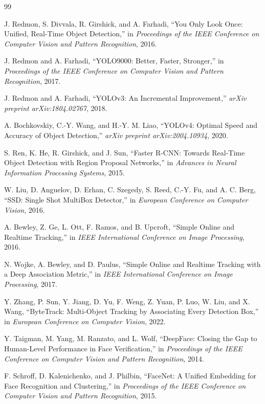 \documentclass[11pt]{article}
\begin{document}
\begin{thebibliography}{99}

J. Redmon, S. Divvala, R. Girshick, and A. Farhadi,
``You Only Look Once: Unified, Real-Time Object Detection,''
in \textit{Proceedings of the IEEE Conference on Computer Vision and Pattern Recognition}, 2016.

J. Redmon and A. Farhadi,
``YOLO9000: Better, Faster, Stronger,''
in \textit{Proceedings of the IEEE Conference on Computer Vision and Pattern Recognition}, 2017.

J. Redmon and A. Farhadi,
``YOLOv3: An Incremental Improvement,''
\textit{arXiv preprint arXiv:1804.02767}, 2018.

A. Bochkovskiy, C.-Y. Wang, and H.-Y. M. Liao,
``YOLOv4: Optimal Speed and Accuracy of Object Detection,''
\textit{arXiv preprint arXiv:2004.10934}, 2020.

S. Ren, K. He, R. Girshick, and J. Sun,
``Faster R-CNN: Towards Real-Time Object Detection with Region Proposal Networks,''
in \textit{Advances in Neural Information Processing Systems}, 2015.

W. Liu, D. Anguelov, D. Erhan, C. Szegedy, S. Reed, C.-Y. Fu, and A. C. Berg,
``SSD: Single Shot MultiBox Detector,''
in \textit{European Conference on Computer Vision}, 2016.

A. Bewley, Z. Ge, L. Ott, F. Ramos, and B. Upcroft,
``Simple Online and Realtime Tracking,''
in \textit{IEEE International Conference on Image Processing}, 2016.

N. Wojke, A. Bewley, and D. Paulus,
``Simple Online and Realtime Tracking with a Deep Association Metric,''
in \textit{IEEE International Conference on Image Processing}, 2017.

Y. Zhang, P. Sun, Y. Jiang, D. Yu, F. Weng, Z. Yuan, P. Luo, W. Liu, and X. Wang,
``ByteTrack: Multi-Object Tracking by Associating Every Detection Box,''
in \textit{European Conference on Computer Vision}, 2022.

Y. Taigman, M. Yang, M. Ranzato, and L. Wolf,
``DeepFace: Closing the Gap to Human-Level Performance in Face Verification,''
in \textit{Proceedings of the IEEE Conference on Computer Vision and Pattern Recognition}, 2014.

F. Schroff, D. Kalenichenko, and J. Philbin,
``FaceNet: A Unified Embedding for Face Recognition and Clustering,''
in \textit{Proceedings of the IEEE Conference on Computer Vision and Pattern Recognition}, 2015.


\end{thebibliography}
\end{document}
